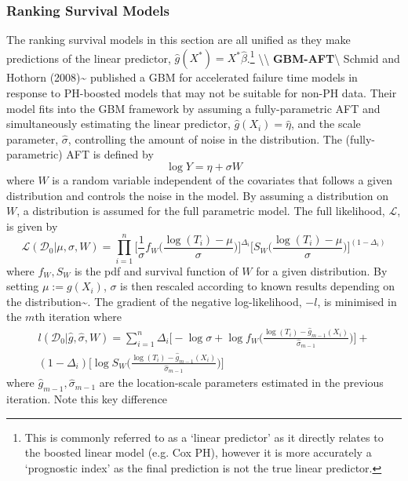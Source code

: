 \documentclass[
  letterpaper,
]{scrbook}
\theoremstyle{plain}
\theoremstyle{definition}
\theoremstyle{remark}
\begin{document}
\subsubsection{Ranking Survival Models}

The ranking survival models in this section are all unified as they make
predictions of the linear predictor,
\(\hat{g}(X^*) = X^*\hat{\beta}\).\footnote{This is commonly referred to as a `linear predictor' as it directly relates to the boosted linear model (e.g. Cox PH), however it is more accurately a `prognostic index' as the final prediction is not the true linear predictor.}
\textbackslash\textbackslash{}
\textbf{GBM-AFT}\label{mod:gbmaft}\textbackslash{} Schmid and Hothorn
(2008)\textasciitilde{}\cite{Schmid2008b} published a GBM for
accelerated failure time models in response to PH-boosted models that
may not be suitable for non-PH data. Their model fits into the GBM
framework by assuming a fully-parametric AFT and simultaneously
estimating the linear predictor, \(\hat{g}(X_i) =\hat{\eta}\), and the
scale parameter, \(\hat{\sigma}\), controlling the amount of noise in
the distribution. The (fully-parametric) AFT is defined by \[
\log Y = \eta + \sigma W
\] where \(W\) is a random variable independent of the covariates that
follows a given distribution and controls the noise in the model. By
assuming a distribution on \(W\), a distribution is assumed for the full
parametric model. The full likelihood, \(\mathcal{L}\), is given by \[
\mathcal{L}(\mathcal{D}_0|\mu, \sigma, W) = \prod^n_{i=1} \Big[\frac{1}{\sigma} f_W\Big(\frac{\log(T_i) - \mu}{\sigma}\Big)\Big]^{\Delta_i}\Big[S_W\Big(\frac{\log(T_i) - \mu}{\sigma}\Big)\Big]^{(1-\Delta_i)}
\label{eq:surv_aft_like}
\] where \(f_W, S_W\) is the pdf and survival function of \(W\) for a
given distribution. By setting \(\mu := g(X_i)\), \(\sigma\) is then
rescaled according to known results depending on the
distribution\textasciitilde{}\cite{Klein2003}. The gradient of the
negative log-likelihood, \(-l\), is minimised in the \(m\)th iteration
where \[
\begin{split}
l(\mathcal{D}_0|\hat{g}, \hat{\sigma},W) = \sum^n_{i=1} \Delta_i\Big[- \log\sigma + \log f_W\Big(\frac{\log(T_i) - \hat{g}_{m-1}(X_i)}{\hat{\sigma}_{m-1}}\Big)\Big] + \\
(1-\Delta_i)\Big[\log S_W\Big(\frac{\log(T_i) - \hat{g}_{m-1}(X_i)}{\hat{\sigma}_{m-1}}\Big)\Big]
\end{split}
\] where \(\hat{g}_{m-1}, \hat{\sigma}_{m-1}\) are the location-scale
parameters estimated in the previous iteration. Note this key difference
\end{document}
